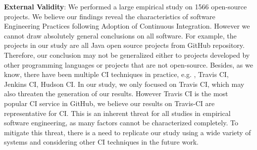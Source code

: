 \textbf{External Validity}: We performed a large empirical study on 1566 open-source projects. We believe our findings reveal the characteristics of software Engineering Practices following Adoption of Continuous Integration. However we cannot draw absolutely general conclusions on all software.
For example, the projects in our study are all Java open source projects from GitHub repository. Therefore, our conclusion may not be generalized either to projects developed by other programming languages or projects that are not open-source. Besides, as we know, there have been multiple CI techniques in practice, e.g. , Travis CI, Jenkins CI, Hudson CI. In our study, we only focused on Travis CI, which may also threaten the generation of our results. However Travis CI is the most popular CI service in GitHub, we believe our results on Travis-CI are representative for CI.  This is an inherent threat for all studies in empirical software engineering, as many factors cannot be characterized completely. To mitigate this threat, there is a need to replicate our study using a wide variety of systems and considering other CI techniques in the future work.

